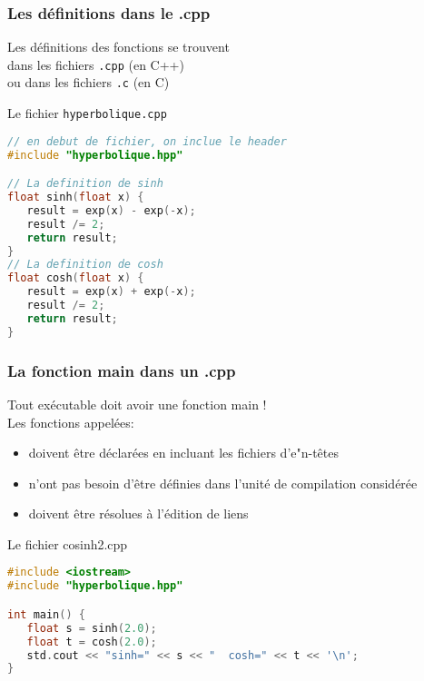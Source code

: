 \documentclass{beamer}
\begin{document}
\begin{frame}[fragile=singleslide,shrink=20]
\frametitle{Les définitions dans le .cpp}
Les définitions des fonctions se trouvent \\
dans les fichiers \texttt{.cpp} (en C++) \\
ou dans les fichiers \texttt{.c} (en C)

\begin{block}{Le fichier \texttt{hyperbolique.cpp}}
\begin{lstlisting}[language=c++]
// en debut de fichier, on inclue le header
#include "hyperbolique.hpp"

// La definition de sinh
float sinh(float x) {
   result = exp(x) - exp(-x);
   result /= 2;
   return result;
}
// La definition de cosh
float cosh(float x) {
   result = exp(x) + exp(-x);
   result /= 2;
   return result;
}

\end{lstlisting}
\end{block}
\end{frame}

\begin{frame}[fragile=singleslide,shrink=20]
\frametitle{La fonction main dans un .cpp}
Tout exécutable doit avoir une fonction main ! \\
Les fonctions appelées:
\begin{itemize}
\item{doivent être déclarées en incluant les fichiers d'e"n-têtes}
\item{n'ont pas besoin d'être définies dans l'unité de compilation considérée}
\item{doivent être résolues à l'édition de liens}
\end{itemize}

\begin{block}{Le fichier cosinh2.cpp}
\begin{lstlisting}[language=c++]
#include <iostream>
#include "hyperbolique.hpp"

int main() {
   float s = sinh(2.0);
   float t = cosh(2.0);
   std.cout << "sinh=" << s << "  cosh=" << t << '\n';
}
\end{lstlisting}
\end{block}
\end{frame}
\end{document}
